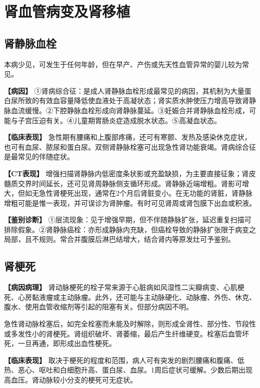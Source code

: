 \section{肾血管病变及肾移植}

\subsection{肾静脉血栓}

本病少见，可发生于任何年龄，但在早产、产伤或先天性血管异常的婴儿较为常见。

\textbf{【病因】}
①肾病综合征：是成人肾静脉血栓形成最常见的病因，其机制为大量蛋白尿所致的有效血容量降低使血液处于高凝状态；肾实质水肿使压力增高导致肾静脉血流缓慢。②下腔静脉血栓形成向肾静脉蔓延。③妊娠合并肾静脉血栓形成，可能与子宫压迫有关。④儿童期胃肠炎症造成脱水状态。⑤高凝血状态。

\textbf{【临床表现】}
急性期有腰痛和上腹部疼痛，还可有寒颤、发热及感染休克症状，也可有血尿、脓尿和蛋白尿。双侧肾静脉栓塞可出现急性肾功能衰竭。肾病综合征是最常见的伴随症状。

\textbf{【CT表现】}
增强扫描肾静脉内低密度条状影或充盈缺损，为主要直接征象；肾皮髓质交界时间延长，还可见肾周静脉侧支循环形成。肾静脉近端增粗。肾影可增大，但如无急性肾梗死出现，通常在2个月后肾脏变小。在无功能的肾脏，肾静脉增粗可能是惟一表现，并可误诊为肾肿瘤。有时可见肾周或肾包膜下出血或积液。

\textbf{【鉴别诊断】}
①层流现象：见于增强早期，但不伴随静脉扩张，延迟重复扫描可排除假象。②肾静脉癌栓：亦形成静脉内充缺，但癌栓导致的静脉扩张限于病变之局部，且不规则。常合并腹膜后淋巴结增大，结合肾内等原发灶可予鉴别。

\subsection{肾梗死}

\textbf{【病因病理】}
肾动脉梗死的栓子常来源于心脏病如风湿性二尖瓣病变、心肌梗死、心房黏液瘤或主动脉瘤。此外，还可能与主动脉硬化、动脉瘤、外伤、休克、腹水、使用血管收缩剂等引起的阻塞有关。但部分病因不明。

急性肾动脉栓塞后，如完全栓塞而未能及时解除，则形成全肾性、部分性、节段性或多发性小的肾梗死。肾组织破坏、肾萎缩，最后产生纤维硬变。栓塞后血管坏死，一旦再通，即形成出血性梗死。

\textbf{【临床表现】}
取决于梗死的程度和范围，病人可有突发的剧烈腰痛和腹痛、低热、恶心、呕吐和白细胞升高、蛋白尿、血尿。1周后症状可缓解。少数后期出现高血压。肾动脉较小分支的梗死可无症状。

